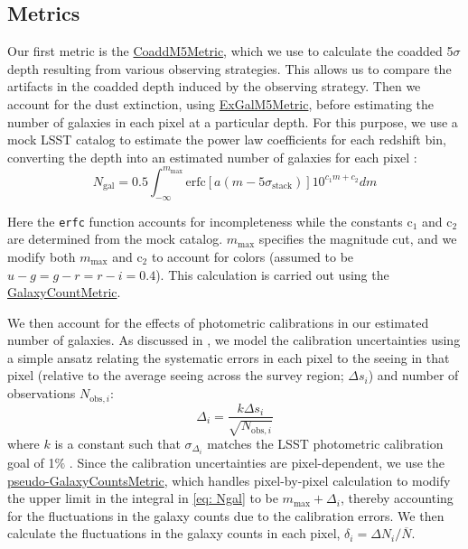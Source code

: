 \subsection{Metrics}
\label{sec:\secname:metrics}
Our first metric is the \href{https://github.com/lsst/sims_maf/blob/master/python/lsst/sims/maf/metrics/simpleMetrics.py}{CoaddM5Metric}, which we use to calculate the coadded 5$\sigma$ depth resulting from various observing strategies. This allows us to compare the artifacts in the coadded depth induced by the observing strategy. Then we account for the dust extinction, using \href{https://github.com/lsst/sims_maf/blob/master/python/lsst/sims/maf/metrics/exgalM5.py}{ExGalM5Metric}, before estimating the number of galaxies in each pixel at a particular depth. For this purpose, we use a mock LSST catalog \citep{MunozEtal2015} to estimate the power law coefficients for each redshift bin, converting the depth into an estimated number of galaxies for each pixel \citep[Eq. 2]{AwanEtal2016}:
\begin{equation}
	N_{\mathrm{gal}}= 0.5\int_{-\infty}^{m_\mathrm{{max}}} {\mathrm{erfc}[a(m-5\sigma_{\mathrm{stack}})] 10^{c_1m + c_2}dm}
	\label{eq: Ngal}
\end{equation}

Here the \texttt{erfc} function accounts for incompleteness while the constants c$_1$ and c$_2$ are determined from the mock catalog. $m_{\mathrm{max}}$ specifies the magnitude cut, and we modify both $m_\mathrm{{max}}$ and c$_2$ to account for colors (assumed to be $u-g= g-r= r-i= 0.4$). This calculation is carried out using the \href{https://github.com/humnaawan/sims_maf_contrib/blob/master/mafContrib/galaxyCountsMetric_extended.py}{GalaxyCountMetric}.

We then account for the effects of photometric calibrations in our estimated number of galaxies. As discussed in \citet{AwanEtal2016}, we model the calibration uncertainties using a simple ansatz relating the systematic errors in each pixel to the seeing in that pixel (relative to the average seeing across the survey region; $\Delta s_{i}$)  and number of observations $N_{\mathrm{obs},i}$:
\begin{equation}
	\Delta_{i}= \frac{k \Delta s_{i}}{\sqrt{N_{\mathrm{obs}, i}}}
\end{equation}
where $k$ is a constant such that $\sigma_{\Delta_i}$ matches the LSST photometric calibration goal of 1$\%$  \citep{2009arXiv0912.0201L}. Since the calibration uncertainties are pixel-dependent, we use the \href{https://github.com/humnaawan/sims_maf_contrib/blob/master/mafContrib/galaxyCounts_withPixelCalibration.py}{pseudo-GalaxyCountsMetric}, which handles pixel-by-pixel calculation to modify the upper limit in the integral in \autoref{eq: Ngal} to be $m_{\mathrm{max}} + \Delta_{i}$, thereby accounting for the fluctuations in the galaxy counts due to the calibration errors. We then calculate the fluctuations in the galaxy counts in each pixel, $\delta_i= \Delta N_i/\overline{N}$.

